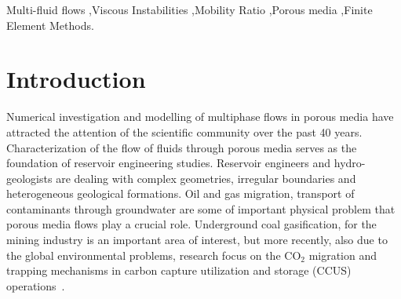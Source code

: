 \documentclass[preprint,authoryear,12pt]{elsarticle}
\newcommand{\JGnote}[1]{\fbox{\parbox{\textwidth}{ \color{red} JG Note $\Rightarrow$ #1}}}
\begin{document}
\begin{frontmatter}
\begin{abstract}

\end{abstract} 

\begin{keyword} %
 Multi-fluid flows \sep Viscous Instabilities \sep Mobility Ratio \sep Porous media \sep Finite Element Methods.
\end{keyword}
 
\end{frontmatter}


\clearpage

\section{Introduction}\label{section:intro}
\medskip
Numerical investigation and modelling of multiphase flows in porous media have attracted the attention of the scientific community over the past 40 years. Characterization of the flow of fluids through porous media serves as the foundation of reservoir engineering studies. Reservoir engineers and hydro-geologists are dealing with complex geometries, irregular boundaries and heterogeneous geological formations. Oil and gas migration, transport of contaminants through groundwater are some of important physical problem that porous media flows play a crucial role. Underground coal gasification, for the mining industry is an important area of interest, but more recently, also due to the global environmental problems, research focus on the CO$_{\text{2}}$ migration and trapping mechanisms in carbon capture utilization and storage (CCUS) operations~\citep{spycher_2003, chen_2006, self_2012, pruess_1990c, white_1981,jiang_2011}.
\end{document}
